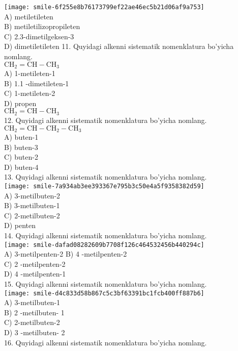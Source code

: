 \texttt{[image: smile-6f255e8b76173799ef22ae46ec5b21d06af9a753]}\\
A) metiletileten\\
B) metiletilizopropileten\\
C) 2.3-dimetilgeksen-3\\
D) dimetiletileten
11. Quyidagi alkenni sistematik nomenklatura bo'yicha nomlang.\\
$\mathrm{CH}_{2}=\mathrm{CH}-\mathrm{CH}_{3}$\\
A) 1-metileten-1\\
B) 1.1 -dimetileten-1\\
C) 1-metileten-2\\
D) propen\\$\mathrm{CH}_{2}=\mathrm{CH}-\mathrm{CH}_{3}$\\
12. Quyidagi alkenni sistematik nomenklatura bo'yicha nomlang.\\
$\mathrm{CH}_{2}=\mathrm{CH}-\mathrm{CH}_{2}-\mathrm{CH}_{3}$\\
A) buten-1\\
B) buten-3\\
C) buten-2\\
D) buten-4\\
13. Quyidagi alkenni sistematik nomenklatura bo'yicha nomlang.\\
\texttt{[image: smile-7a934ab3ee393367e795b3c50e4a5f9358382d59]}\\
A) 3-metilbuten-2\\
B) 3-metilbuten-1\\
C) 2-metilbuten-2\\
D) penten\\
14. Quyidagi alkenni sistematik nomenklatura bo'yicha nomlang.\\
\texttt{[image: smile-dafad08282609b7708f126c464532456b440294c]}\\
A) 3-metilpenten-2 
B) 4 -metilpenten-2\\
C) 2 -metilpenten-2\\ 
D) 4 -metilpenten-1\\
15. Quyidagi alkenni sistematik nomenklatura bo'yicha nomlang.\\
\texttt{[image: smile-d4c833d58b867c5c3bf63391bc1fcb400ff887b6]}\\
A) 3-metilbuten-1\\
B) 2 -metilbuten- 1\\
C) 2-metilbuten-2\\
D) 3 -metilbuten- 2\\
16. Quyidagi alkenni sistematik nomenklatura bo'yicha nomlang.\\

